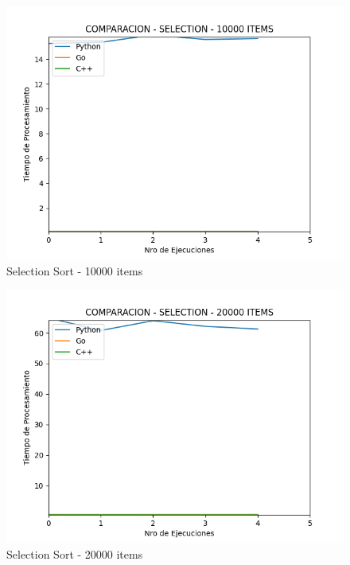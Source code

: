 \documentclass[12pt]{article} %
\begin{document}
    \vspace{5mm}
    
    \begin{figure}[H]
    \centering
    \includegraphics[width=\textwidth]{selection_10000}
    \caption{Selection Sort - 10000 items}
    \end{figure}

    \vspace{5mm}
    
    \begin{figure}[H]
    \centering
    \includegraphics[width=\textwidth]{selection_20000}
    \caption{Selection Sort - 20000 items}
    \end{figure}
\end{document}

